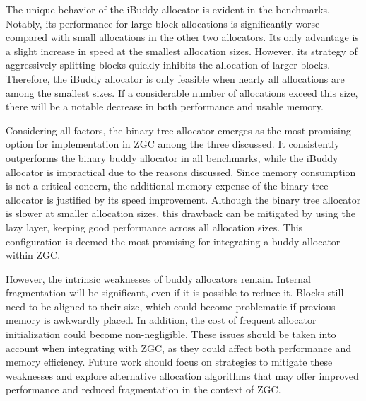 \newpage
The unique behavior of the iBuddy allocator is evident in the benchmarks. Notably, its performance for large block allocations is significantly worse compared with small allocations in the other two allocators. Its only advantage is a slight increase in speed at the smallest allocation sizes. However, its strategy of aggressively splitting blocks quickly inhibits the allocation of larger blocks. Therefore, the iBuddy allocator is only feasible when nearly all allocations are among the smallest sizes. If a considerable number of allocations exceed this size, there will be a notable decrease in both performance and usable memory.

Considering all factors, the binary tree allocator emerges as the most promising option for implementation in ZGC among the three discussed. It consistently outperforms the binary buddy allocator in all benchmarks, while the iBuddy allocator is impractical due to the reasons discussed. Since memory consumption is not a critical concern, the additional memory expense of the binary tree allocator is justified by its speed improvement. Although the binary tree allocator is slower at smaller allocation sizes, this drawback can be mitigated by using the lazy layer, keeping good performance across all allocation sizes. This configuration is deemed the most promising for integrating a buddy allocator within ZGC.

However, the intrinsic weaknesses of buddy allocators remain. Internal fragmentation will be significant, even if it is possible to reduce it. Blocks still need to be aligned to their size, which could become problematic if previous memory is awkwardly placed. In addition, the cost of frequent allocator initialization could become non-negligible. These issues should be taken into account when integrating with ZGC, as they could affect both performance and memory efficiency. Future work should focus on strategies to mitigate these weaknesses and explore alternative allocation algorithms that may offer improved performance and reduced fragmentation in the context of ZGC.

